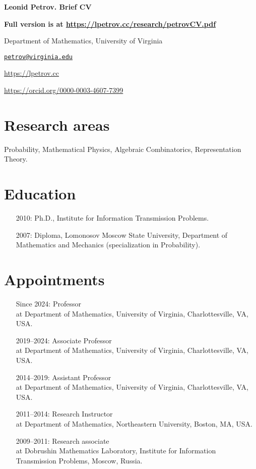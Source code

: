 \documentclass[letterpaper,11pt]{article}
\def\name{Leonid Petrov}
\begin{document}
\centerline{\huge \bf \name . Brief CV}
\bigskip

\textbf{Full version is at \url{https://lpetrov.cc/research/petrovCV.pdf}}

\noindent\hrulefill

\vspace{0.25in}

Department of Mathematics, University of Virginia

\href{mailto:petrov@virginia.edu}{\tt petrov@virginia.edu}

\url{https://lpetrov.cc}

\url{https://orcid.org/0000-0003-4607-7399}

\section*{Research areas}

Probability, Mathematical Physics, Algebraic Combinatorics, Representation
Theory.

\section*{Education}

\begin{itemize}
	\item [2010:]
		Ph.D.,
		Institute for Information Transmission Problems.

	\item [2007:]
		Diploma,
		Lomonosov Moscow State University,
		Department of Mathematics and Mechanics (specialization in Probability).
\end{itemize}

\section*{Appointments}

\begin{itemize}
	\item
	[Since 2024:]
	Professor\\ at Department of Mathematics, University
	of Virginia, Charlottesville, VA, USA.
\item
	[2019--2024:]
	Associate Professor\\ at Department of Mathematics, University
	of Virginia, Charlottesville, VA, USA.
	\item
	      [2014--2019:]
	      Assistant Professor\\ at Department of Mathematics, University
	      of Virginia, Charlottesville, VA, USA.
	\item
	      [2011--2014:]
	      Research Instructor\\ at Department of Mathematics, Northeastern
	      University, Boston, MA, USA.
	\item
	      [2009--2011:]
	      Research associate\\ at Dobrushin Mathematics Laboratory,
	      Institute for Information Transmission Problems, Moscow, Russia.
\end{itemize}
\end{document}

